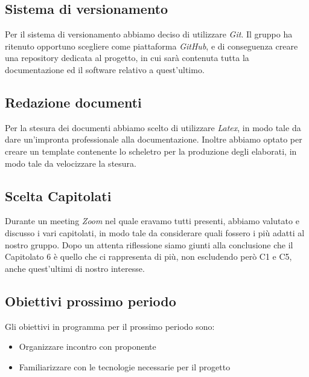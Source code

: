 \subsection{Sistema di versionamento}
Per il sistema di versionamento abbiamo deciso di utilizzare \textit{Git}.  Il gruppo ha ritenuto opportuno scegliere come piattaforma \textit{GitHub}, e di conseguenza creare una repository dedicata al progetto, in cui sarà contenuta tutta la documentazione ed il software relativo a quest'ultimo.

\subsection{Redazione documenti}
Per la stesura dei documenti abbiamo scelto di utilizzare \textit{Latex}, in modo tale da dare un'impronta professionale alla documentazione.  Inoltre abbiamo optato per creare un template contenente lo scheletro per la produzione degli elaborati,  in modo tale da velocizzare la stesura.

\subsection{Scelta Capitolati}
Durante un meeting \textit{Zoom} nel quale eravamo tutti presenti, abbiamo valutato e discusso i vari capitolati,  in modo tale da considerare quali fossero i più adatti al nostro gruppo.  Dopo un attenta riflessione siamo giunti alla conclusione che il Capitolato 6 è quello che ci rappresenta  di più,  non escludendo però C1 e C5, anche quest'ultimi di nostro interesse.

\subsection{Obiettivi prossimo periodo}
Gli obiettivi in programma per il prossimo periodo sono:
\begin{itemize}
\item Organizzare incontro con proponente
\item Familiarizzare con le tecnologie necessarie per il progetto
\end{itemize}
